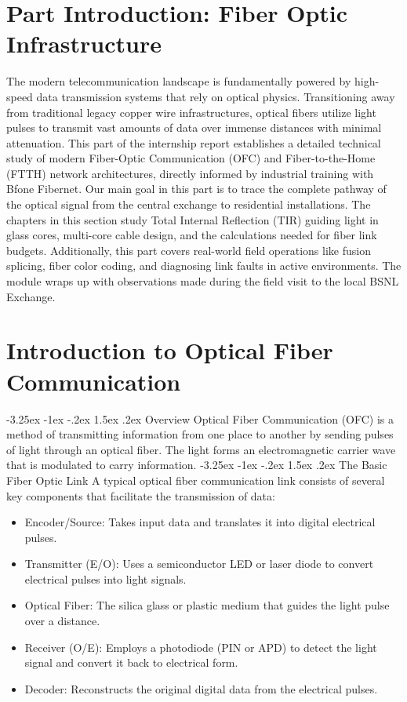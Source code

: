 \documentclass[11pt,a4paper]{report}
\makeatletter
\renewcommand{\section}{\@startsection{section}{1}{\z@}%
  {-3.25ex \@plus -1ex \@minus -.2ex}%
  {1.5ex \@plus.2ex}%
  {\normalfont\Large\bfseries\color{primaryColor}}}
\makeatother
\begin{document}
\chapter*{Part Introduction: Fiber Optic Infrastructure}
The modern telecommunication landscape is fundamentally powered by high-speed data transmission systems that rely on optical physics. Transitioning away from traditional legacy copper wire infrastructures, optical fibers utilize light pulses to transmit vast amounts of data over immense distances with minimal attenuation. This part of the internship report establishes a detailed technical study of modern Fiber-Optic Communication (OFC) and Fiber-to-the-Home (FTTH) network architectures, directly informed by industrial training with Bfone Fibernet. Our main goal in this part is to trace the complete pathway of the optical signal from the central exchange to residential installations. The chapters in this section study Total Internal Reflection (TIR) guiding light in glass cores, multi-core cable design, and the calculations needed for fiber link budgets. Additionally, this part covers real-world field operations like fusion splicing, fiber color coding, and diagnosing link faults in active environments. The module wraps up with observations made during the field visit to the local BSNL Exchange.
\chapter{Introduction to Optical Fiber Communication}
\section{Overview}
Optical Fiber Communication (OFC) is a method of transmitting information from one place to another by sending pulses of light through an optical fiber. The light forms an electromagnetic carrier wave that is modulated to carry information.
\section{The Basic Fiber Optic Link}
A typical optical fiber communication link consists of several key components that facilitate the transmission of data:
\begin{itemize}
  \item Encoder/Source: Takes input data and translates it into digital electrical pulses.
  \item Transmitter (E/O): Uses a semiconductor LED or laser diode to convert electrical pulses into light signals.
  \item Optical Fiber: The silica glass or plastic medium that guides the light pulse over a distance.
  \item Receiver (O/E): Employs a photodiode (PIN or APD) to detect the light signal and convert it back to electrical form.
  \item Decoder: Reconstructs the original digital data from the electrical pulses.
\end{itemize}
\end{document}
